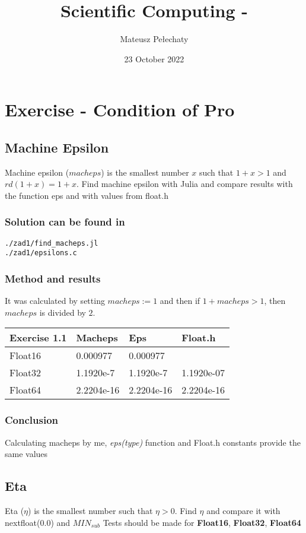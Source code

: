 \documentclass[12pt]{article}
\title{Scientific Computing - }
\author{Mateusz Pełechaty}
\date{23 October 2022}%
\begin{document}
\maketitle

\section{Exercise - Condition of Pro}
\subsection{Machine Epsilon}
Machine epsilon ($macheps$) is the smallest number $x$ such that $1+x > 1$ and $rd(1+x) = 1+x$. \newline
Find machine epsilon with Julia and compare results with the function eps and with values from float.h
\subsubsection*{Solution can be found in}
\begin{verbatim}
./zad1/find_macheps.jl
./zad1/epsilons.c
\end{verbatim}
\subsubsection*{Method and results}
It was calculated by setting $macheps := 1$ and then if $1+macheps > 1$, then $macheps$ is divided by $2$.
\begin{table}[!ht]
    \centering
    \begin{tabular}{|l|l|l|l|}
    \hline
        Exercise 1.1 & Macheps & Eps & Float.h \\ \hline
        Float16 & 0.000977 & 0.000977 & ~ \\ \hline
        Float32 & 1.1920e-7 & 1.1920e-7 & 1.1920e-07 \\ \hline
        Float64 & 2.2204e-16 & 2.2204e-16 & 2.2204e-16 \\ \hline
    \end{tabular}
\end{table}
\subsubsection*{Conclusion}
Calculating macheps by me, \emph{eps(type)} function and Float.h constants provide the same values
\subsection{Eta}
Eta ($\eta$) is the smallest number such that $\eta > 0$. \newline
Find $\eta$ and compare it with nextfloat(0.0) and $MIN_{sub}$ \newline
Tests should be made for \textbf{Float16}, \textbf{Float32}, \textbf{Float64}
\end{document}
